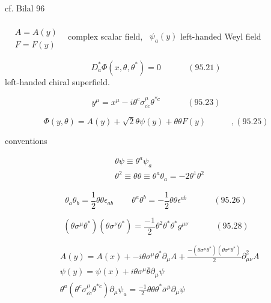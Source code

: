 \documentclass[twoside]{amsart}
\begin{document}
cf. Bilal 96

$\begin{aligned} & \quad \\ 
  & A = A(y) \\
  & F = F(y) \end{aligned}$ \quad \, complex scalar field, \, $\psi_a(y)$ left-handed Weyl field

\begin{equation}
  D^*_{\dot{a}}\Phi(x,\theta, \theta^*) = 0 \quad \quad \quad \, (95.21)
\end{equation}
left-handed chiral superfield. 

\begin{equation}
  y^{\mu} = x^{\mu} - i\theta^c\sigma^{\mu}_{ c\dot{c}} \theta^{ * \dot{c}} \quad \quad \quad \, (95.23)
\end{equation}

\begin{equation}
  \Phi(y,\theta) = A(y) + \sqrt{2} \theta \psi(y) + \theta \theta F(y) \quad \quad \quad , (95.25)
\end{equation}

conventions

\[
\begin{aligned}
  & \theta \psi \equiv \theta^a \psi_a \\ 
  &  \theta^2 \equiv \theta \theta \equiv \theta^a \theta_a = -2 \theta^1 \theta^2
\end{aligned}
\]



\begin{equation}
  \theta_a \theta_b = \frac{1}{2} \theta \theta \epsilon_{ab} \quad \quad \, \theta^a \theta^b = -\frac{1}{2} \theta \theta \epsilon^{ab} \quad \quad \quad \, (95.26)
\end{equation}

\begin{equation}
  (\theta \sigma^{\mu} \theta^*) ( \theta \sigma^{\nu} \theta^*) = \frac{-1}{2} \theta^2 \theta^* \theta^* g^{\mu \nu} \quad \quad \quad \, (95.28)
\end{equation}

\[
\begin{aligned}
  & A(y) = A(x) + - i \theta \sigma^{\mu} \theta^* \partial_{\mu} A + \frac{ - (\theta \sigma^{\mu} \theta^*)( \theta \sigma^{\nu} \theta^*) }{ 2 } \partial^2_{\mu \nu} A \\ 
  & \psi(y) = \psi(x) + i \theta\sigma^{\mu} \overline{\theta} \partial_{\mu} \psi \\ 
  & \theta^a (\theta^c \sigma^{\mu}_{c\dot{c} } \theta^{ * \dot{c}} ) \partial_{\mu} \psi_{\dot{a}} = \frac{-1}{2} \theta \theta \theta^* \overline{\sigma}^{\mu} \partial_{\mu} \psi 
\end{aligned}
\]
\end{document}
